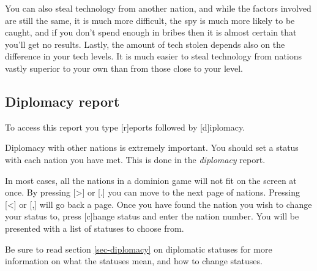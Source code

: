     You can also steal technology from another nation, and 
while the factors involved are still the same, it is much more
difficult, the spy is much more likely to be caught, and if 
you don't spend enough in bribes then it is almost certain that
you'll get no results.  Lastly, the amount of tech stolen depends
also on the difference in your tech levels.  It is much easier
to steal technology from nations vastly superior to your own than
from those close to your level.

\subsection{Diplomacy report}
To access this report you type [r]eports followed by [d]iplomacy.

Diplomacy with other nations is extremely important.  You should set a
status with each nation you have met.  This is done in the
{\em diplomacy} report.

In most cases, all the nations in a dominion game will not fit on the
screen at once.  By pressing [>] or [.] you can move to the next page
of nations.  Pressing [<] or [,] will go back a page.  Once you have
found the nation you wish to change your status to, press [c]hange
status and enter the nation number.  You will be presented with a list
of statuses to choose from.

Be sure to read section \ref{sec-diplomacy} on diplomatic statuses
for more information on what the statuses mean, and how to change
statuses.

